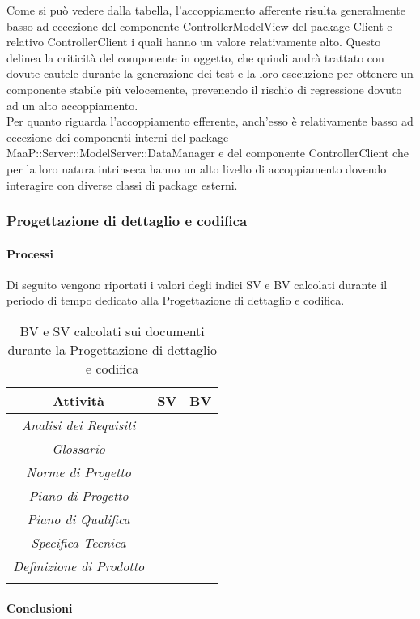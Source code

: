 Come si può vedere dalla tabella, l'accoppiamento afferente risulta generalmente basso ad eccezione del componente ControllerModelView del package Client e relativo ControllerClient i quali hanno un valore relativamente alto. Questo delinea la criticità del componente in oggetto, che quindi andrà trattato con dovute cautele durante la generazione dei test e la loro esecuzione per ottenere un componente stabile più velocemente, prevenendo il rischio di regressione dovuto ad un alto accoppiamento.\\
Per quanto riguarda l'accoppiamento efferente, anch'esso è relativamente basso ad eccezione dei componenti interni del package MaaP::Server::ModelServer::DataManager e del componente ControllerClient che per la loro natura intrinseca hanno un alto livello di accoppiamento dovendo interagire con diverse classi di package esterni.

\subsubsection{Progettazione di dettaglio e codifica}
\paragraph{Processi}
Di seguito vengono riportati i valori degli indici SV e BV calcolati durante il periodo di tempo dedicato alla Progettazione di dettaglio e codifica.
\begin{longtable}{|c|p{3cm}|p{3cm}|}
\toprule
\textbf{Attività} & \textbf{SV} & \textbf{BV} \\


\midrule
\emph{Analisi dei Requisiti} &  & \\
\midrule
\emph{Glossario} &   & \\
\midrule
\emph{Norme di Progetto} &  & \\
\midrule
\emph{Piano di Progetto} &  &  \\
\midrule
\emph{Piano di Qualifica} &  & \\
\midrule
\emph{Specifica Tecnica} &  & \\
\midrule
\emph{Definizione di Prodotto} &  & \\
\bottomrule
\caption{BV e SV calcolati sui documenti durante la Progettazione di dettaglio e codifica}
\label{tab:changelog}
\end{longtable}

\paragraph{Conclusioni}


